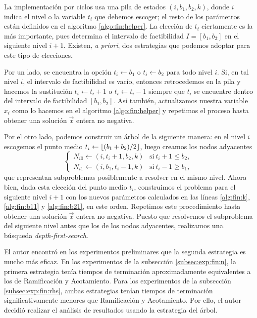 La implementación por ciclos usa una pila de estados $(i, b_1, b_2, k)$, donde $i$ indica el nivel o
la variable $t_i$ que debemos escoger; el resto de los parámetros están definidos en el algoritmo
\ref{algo:fin:helper}. La elección de $t_i$ ciertamente es la más importante, pues determina el
intervalo de factibilidad $I = [b_1, b_2]$ en el siguiente nivel $i + 1$. Existen, \textit{a
priori}, dos estrategias que podemos adoptar para este tipo de elecciones.

Por un lado, se encuentra la opción $t_i \leftarrow b_1$ o $t_i \leftarrow b_2$ para todo nivel
$i$. Si, en tal nivel $i$, el intervalo de factibilidad es vacío, entonces retrocedemos
en la pila y hacemos la sustitución $t_i \leftarrow t_i + 1$ o $t_i \leftarrow t_i - 1$ siempre que
$t_i$ se encuentre dentro del intervalo de factibilidad $[b_1, b_2]$. Así también, actualizamos nuestra
variable $x_i$ como lo hacemos en el algoritmo \ref{algo:fin:helper} y repetimos el proceso hasta
obtener una solución $\vec{x}$ entera no negativa.

Por el otro lado, podemos construir un árbol de la siguiente manera: en el nivel $i$
escogemos el punto medio $t_i \leftarrow \left\lfloor (b_1 + b_2)/2 \right\rfloor$, luego creamos los nodos adyacentes
\begin{equation}
	\label{exp:subp}
	\begin{cases}
		N_{i0} \leftarrow (i, t_i + 1, b_2, k) & \text{si}~t_i + 1 \leq b_2, \\
		N_{i1} \leftarrow (i, b_1, t_i - 1, k) & \text{si}~t_i - 1 \geq b_1,
	\end{cases}
\end{equation}
que representan subproblemas posiblemente a resolver en el mismo nivel. Ahora bien, dada esta
elección del punto medio $t_i$, construimos el problema para el siguiente nivel $i + 1$ con los
nuevos parámetros calculados en las líneas \ref{alg:fin:k}, \ref{alg:fin:b11} y \ref{alg:fin:b21},
en este orden. Repetimos este procedimiento hasta obtener una solución $\vec{x}$ entera no negativa.
Puesto que resolvemos el subproblema del siguiente nivel antes que los de los nodos adyacentes,
realizamos una búsqueda \textit{depth-first-search}.

El autor encontró en los experimentos preliminares que la segunda estrategia es mucho más eficaz. En
los experimentos de la subsección \ref{subsec:exp:fin:n}, la primera estrategia tenía tiempos de
terminación aproximadamente equivalentes a los de Ramificación y Acotamiento. Para los experimentos
de la subsección \ref{subsec:exp:fin:rhs}, ambas estrategias tenían tiempos de terminación
significativamente menores que Ramificación y Acotamiento. Por ello, el autor decidió realizar el
análisis de resultados usando la estrategia del árbol.

